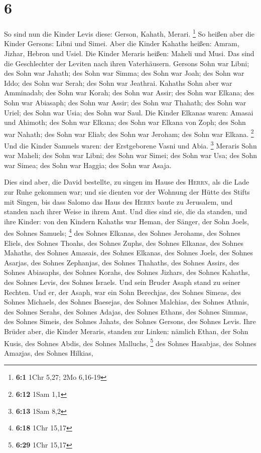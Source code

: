 \hypertarget{section-3}{%
\section{6}\label{section-3}}

 So sind nun die Kinder Levis diese: Gerson, Kahath,
Merari. \footnote{\textbf{6:1} 1Chr 5,27; 2Mo 6,16-19}  So
heißen aber die Kinder Gersons: Libni und Simei.  Aber die
Kinder Kahaths heißen: Amram, Jizhar, Hebron und Usiel. 
Die Kinder Meraris heißen: Maheli und Musi. Das sind die Geschlechter
der Leviten nach ihren Vaterhäusern.  Gersons Sohn war
Libni; des Sohn war Jahath; des Sohn war Simma;  des Sohn
war Joah; des Sohn war Iddo; des Sohn war Serah; des Sohn war Jeathrai.
 Kahaths Sohn aber war Amminadab; des Sohn war Korah; des
Sohn war Assir;  des Sohn war Elkana; des Sohn war
Abiasaph; des Sohn war Assir;  des Sohn war Thahath; des
Sohn war Uriel; des Sohn war Usia; des Sohn war Saul. 
Die Kinder Elkanas waren: Amasai und Ahimoth;  des Sohn
war Elkana; des Sohn war Elkana von Zoph; des Sohn war Nahath;
 des Sohn war Eliab; des Sohn war Jeroham; des Sohn war
Elkana. \footnote{\textbf{6:12} 1Sam 1,1}  Und die Kinder
Samuels waren: der Erstgeborene Vasni und Abia. \footnote{\textbf{6:13}
  1Sam 8,2}  Meraris Sohn war Maheli; des Sohn war Libni;
des Sohn war Simei; des Sohn war Usa;  des Sohn war
Simea; des Sohn war Haggia; des Sohn war Asaja.

 Dies sind aber, die David bestellte, zu singen im Hause
des \textsc{Herrn}, als die Lade zur Ruhe gekommen war; 
und sie dienten vor der Wohnung der Hütte des Stifts mit Singen, bis
dass Salomo das Haus des \textsc{Herrn} baute zu Jerusalem, und standen
nach ihrer Weise in ihrem Amt.  Und dies sind sie, die da
standen, und ihre Kinder: von den Kindern Kahaths war Heman, der Sänger,
der Sohn Joels, des Sohnes Samuels; \footnote{\textbf{6:18} 1Chr 15,17}
 des Sohnes Elkanas, des Sohnes Jerohams, des Sohnes
Eliels, des Sohnes Thoahs,  des Sohnes Zuphs, des Sohnes
Elkanas, des Sohnes Mahaths, des Sohnes Amasais,  des
Sohnes Elkanas, des Sohnes Joels, des Sohnes Asarjas, des Sohnes
Zephanjas,  des Sohnes Thahaths, des Sohnes Assirs, des
Sohnes Abiasaphs, des Sohnes Korahs,  des Sohnes Jizhars,
des Sohnes Kahaths, des Sohnes Levis, des Sohnes Israels.
 Und sein Bruder Asaph stand zu seiner Rechten. Und er,
der Asaph, war ein Sohn Berechjas, des Sohnes Simeas, 
des Sohnes Michaels, des Sohnes Baesejas, des Sohnes Malchias,
 des Sohnes Athnis, des Sohnes Serahs, des Sohnes Adajas,
 des Sohnes Ethans, des Sohnes Simmas, des Sohnes Simeis,
 des Sohnes Jahats, des Sohnes Gersons, des Sohnes Levis.
 Ihre Brüder aber, die Kinder Meraris, standen zur
Linken: nämlich Ethan, der Sohn Kusis, des Sohnes Abdis, des Sohnes
Malluchs, \footnote{\textbf{6:29} 1Chr 15,17}  des Sohnes
Hasabjas, des Sohnes Amazjas, des Sohnes Hilkias,

